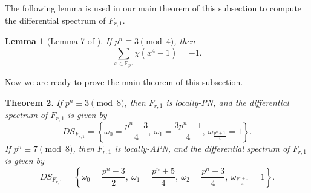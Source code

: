 \documentclass[11pt]{article}
\newtheorem{theorem}{Theorem}[section]
\numberwithin{theorem}{section}
\newtheorem{lemma}[theorem]{Lemma}
\newcommand{\Fpn}{\mathbb{F}_{p^n}}
\begin{document}
The following lemma is used in our main theorem of this subsection to compute the differential spectrum of $F_{r,1}$.

\begin{lemma}[Lemma 7 of \cite{MW25}]\label{chi_lemma x^4-1}
	If $p^n\equiv 3\pmod{4}$, then 
	\begin{equation*}
		\sum_{x\in \Fpn} \chi(x^4-1)=-1.
	\end{equation*}
\end{lemma}

Now we are ready to prove the main theorem of this subsection.
\begin{theorem}\label{DS_theorem}
	If $p^n\equiv 3\pmod{8}$, then $F_{r,1}$ is locally-PN, and the differential spectrum of $F_{r,1}$ is given by
	\begin{equation*}
		DS_{F_{r,1}} = \left\{\omega_0 = \frac{p^n-3}{4},\ \omega_1 = \frac{3p^n-1}{4},\ \omega_{\frac{p^n+1}{4}}=1\right\}.
	\end{equation*}
	If $p^n\equiv 7\pmod{8}$, then $F_{r,1}$ is locally-APN, and the differential spectrum of $F_{r,1}$ is given by
	\begin{equation*}
		DS_{F_{r,1}} = \left\{\omega_0 = \frac{p^n-3}{2},\ \omega_1 = \frac{p^n+5}{4},\ \omega_2 = \frac{p^n-3}{4},\  \omega_{\frac{p^n+1}{4}}=1\right\}.
	\end{equation*}
\end{theorem}
\end{document}
